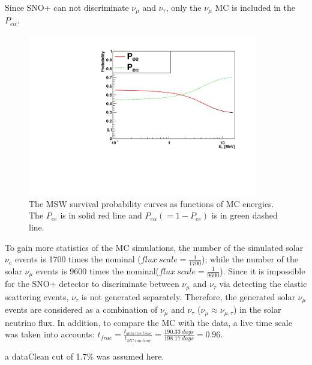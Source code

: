 Since SNO+ can not discriminate $\nu_\mu$ and $\nu_\tau$, only the $\nu_\mu$ MC is included in the $P_{e\alpha}$.

\begin{figure}[!htb]
	\centering
	\includegraphics[width=10cm]{PSelmaa_bs05op.pdf}
	\caption[The MSW survival probability curves as functions of MC energies.]{The MSW survival probability curves as functions of MC energies. The $P_{ee}$ is in solid red line and $P_{e\alpha}(=1-P_{ee})$ is in green dashed line.}
	\label{fig:pselmaa_curves}
\end{figure}


To gain more statistics of the MC simulations, the number of the simulated solar $\nu_e$ events is 1700 times the nominal ($flux~scale = \frac{1}{1700}$); while the number of the solar $\nu_\mu$ events is 9600 times the nominal($flux~scale=\frac{1}{9600}$). Since it is impossible for the SNO+ detector to discriminate between $\nu_\mu$ and $\nu_\tau$ via detecting the elastic scattering events, $\nu_\tau$ is not generated separately. Therefore, the generated solar $\nu_\mu$ events are considered as a combination of $\nu_\mu$ and $\nu_\tau$ ($\nu_\mu\approx\nu_{\mu,\tau}$) in the solar neutrino flux. In addition, to compare the MC with the data, a live time scale was taken into accounts: $t_{frac}=\frac{t_{data~live~time}}{t_{MC~run~time}}=\frac{190.33~days}{198.17~days} = 0.96$.

a dataClean cut of 1.7\% was assumed here.

